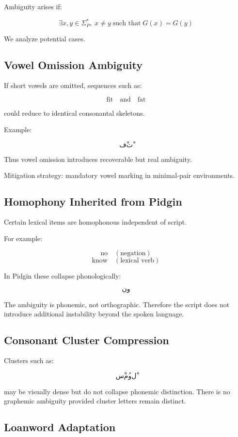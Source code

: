 \documentclass[12pt]{article}
\begin{document}
Ambiguity arises if:

\[
\exists x,y \in \Sigma_P^*, \; x \neq y \;\text{such that}\; G(x) = G(y)
\]

We analyze potential cases.

\subsection{Vowel Omission Ambiguity}

If short vowels are omitted, sequences such as:

\[
\text{fit} \quad \text{and} \quad \text{fat}
\]

could reduce to identical consonantal skeletons.

Example:

\[
فْتْ
\]

Thus vowel omission introduces recoverable but real ambiguity.

Mitigation strategy: mandatory vowel marking in minimal-pair environments.

\subsection{Homophony Inherited from Pidgin}

Certain lexical items are homophonous independent of script.

For example:

\[
\text{no} \quad (\text{negation}) 
\]
\[
\text{know} \quad (\text{lexical verb})
\]

In Pidgin these collapse phonologically:

\[
نو
\]

The ambiguity is phonemic, not orthographic. Therefore the script does not introduce additional instability beyond the spoken language.

\subsection{Consonant Cluster Compression}

Clusters such as:

\[
سْمُولْ
\]

may be visually dense but do not collapse phonemic distinction. There is no graphemic ambiguity provided cluster letters remain distinct.

\subsection{Loanword Adaptation}
\end{document}
